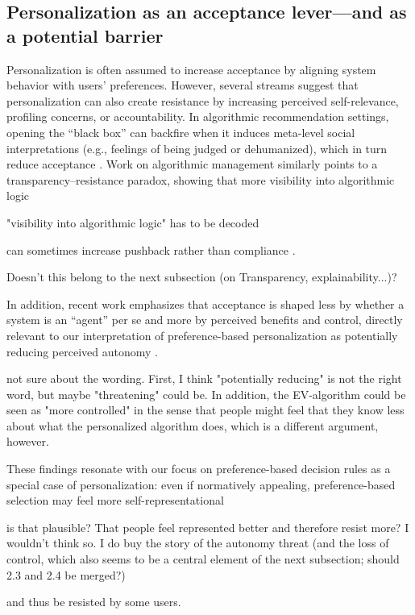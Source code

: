 \documentclass[a4paper, 12pt, fleqn]{article}
\theoremstyle{definition}
\begin{document}
\subsection{Personalization as an acceptance lever---and as a potential barrier}
Personalization is often assumed to increase acceptance by aligning system behavior with users' preferences. However, several streams suggest that personalization can also create resistance by increasing perceived self-relevance, profiling concerns, or accountability. In algorithmic recommendation settings, opening the ``black box'' can backfire when it induces meta-level social interpretations (e.g., feelings of being judged or dehumanized), which in turn reduce acceptance \citep{Chen2024}. Work on algorithmic management similarly points to a {transparency--resistance paradox}, showing that more visibility into algorithmic logic 
\begin{icomm}
	"visibility into algorithmic logic" has to be decoded
\end{icomm}
can sometimes increase pushback rather than compliance \citep{Hu2024}. 
\begin{icomm}
	Doesn't this belong to the next subsection (on Transparency, explainability...)?
\end{icomm}
In addition, recent work emphasizes that acceptance is shaped less by whether a system is an ``agent'' per se and more by perceived benefits and {control}, directly relevant to our interpretation of preference-based personalization as potentially reducing perceived autonomy \citep{Schaap2024}. 
\begin{icomm}
	not sure about the wording. First, I think "potentially reducing" is not the right word, but maybe "threatening" could be. In addition, the EV-algorithm could be seen as "more controlled" in the sense that people might feel that they know less about what the personalized algorithm does, which is a different argument, however.
\end{icomm}
These findings resonate with our focus on preference-based decision rules as a special case of personalization: even if normatively appealing, preference-based selection may feel more self-representational 
\begin{icomm}
	is that plausible? That people feel represented better and therefore resist more? I wouldn't think so. I do buy the story of the autonomy threat (and the loss of control, which also seems to be a central element of the next subsection; should 2.3 and 2.4 be merged?)
\end{icomm}
and thus be resisted by some users.
\end{document}
